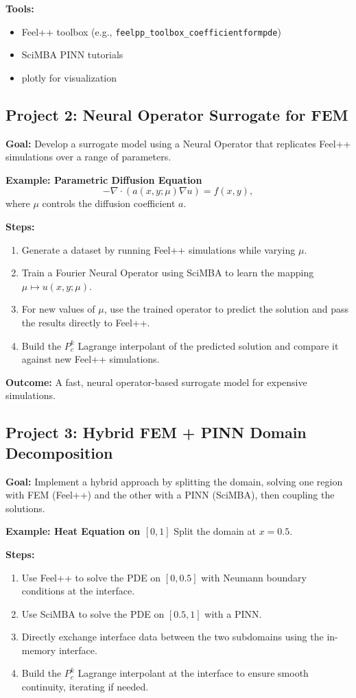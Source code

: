 \documentclass[11pt]{article}
\begin{document}
\textbf{Tools:}
\begin{itemize}
    \item Feel++ toolbox (e.g., \texttt{feelpp\_toolbox\_coefficientformpde})
    \item SciMBA PINN tutorials
    \item plotly for visualization
\end{itemize}

\subsection{Project 2: Neural Operator Surrogate for FEM}
\textbf{Goal:}  
Develop a surrogate model using a Neural Operator that replicates Feel++ simulations over a range of parameters.

\textbf{Example: Parametric Diffusion Equation}
\[
-\nabla \cdot (a(x,y;\mu) \nabla u) = f(x,y),
\]
where \(\mu\) controls the diffusion coefficient \(a\).

\textbf{Steps:}
\begin{enumerate}[label=\arabic*.]
    \item Generate a dataset by running Feel++ simulations while varying \(\mu\).
    \item Train a Fourier Neural Operator using SciMBA to learn the mapping \(\mu \mapsto u(x,y;\mu)\).
    \item For new values of \(\mu\), use the trained operator to predict the solution and pass the results directly to Feel++.
    \item Build the \( P_c^k \) Lagrange interpolant of the predicted solution and compare it against new Feel++ simulations.
\end{enumerate}

\textbf{Outcome:}  
A fast, neural operator-based surrogate model for expensive simulations.

\subsection{Project 3: Hybrid FEM + PINN Domain Decomposition}
\textbf{Goal:}  
Implement a hybrid approach by splitting the domain, solving one region with FEM (Feel++) and the other with a PINN (SciMBA), then coupling the solutions.

\textbf{Example: Heat Equation on \([0,1]\)}
Split the domain at \( x = 0.5 \).

\textbf{Steps:}
\begin{enumerate}[label=\arabic*.]
    \item Use Feel++ to solve the PDE on \([0, 0.5]\) with Neumann boundary conditions at the interface.
    \item Use SciMBA to solve the PDE on \([0.5,1]\) with a PINN.
    \item Directly exchange interface data between the two subdomains using the in-memory interface.
    \item Build the \( P_c^k \) Lagrange interpolant at the interface to ensure smooth continuity, iterating if needed.
\end{enumerate}
\end{document}
